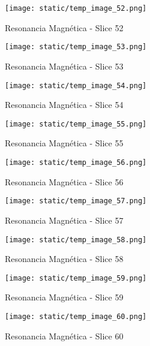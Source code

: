 \documentclass[12pt,a4paper]{article}%
\begin{document}
%


\begin{figure}[H]%
\centering%
\texttt{[image: static/temp\_image\_52.png]}%
\caption{Resonancia Magnética {-} Slice 52}%
\end{figure}

%


\begin{figure}[H]%
\centering%
\texttt{[image: static/temp\_image\_53.png]}%
\caption{Resonancia Magnética {-} Slice 53}%
\end{figure}

%


\begin{figure}[H]%
\centering%
\texttt{[image: static/temp\_image\_54.png]}%
\caption{Resonancia Magnética {-} Slice 54}%
\end{figure}

%


\begin{figure}[H]%
\centering%
\texttt{[image: static/temp\_image\_55.png]}%
\caption{Resonancia Magnética {-} Slice 55}%
\end{figure}

%


\begin{figure}[H]%
\centering%
\texttt{[image: static/temp\_image\_56.png]}%
\caption{Resonancia Magnética {-} Slice 56}%
\end{figure}

%


\begin{figure}[H]%
\centering%
\texttt{[image: static/temp\_image\_57.png]}%
\caption{Resonancia Magnética {-} Slice 57}%
\end{figure}

%


\begin{figure}[H]%
\centering%
\texttt{[image: static/temp\_image\_58.png]}%
\caption{Resonancia Magnética {-} Slice 58}%
\end{figure}

%


\begin{figure}[H]%
\centering%
\texttt{[image: static/temp\_image\_59.png]}%
\caption{Resonancia Magnética {-} Slice 59}%
\end{figure}

%


\begin{figure}[H]%
\centering%
\texttt{[image: static/temp\_image\_60.png]}%
\caption{Resonancia Magnética {-} Slice 60}%
\end{figure}
\end{document}
